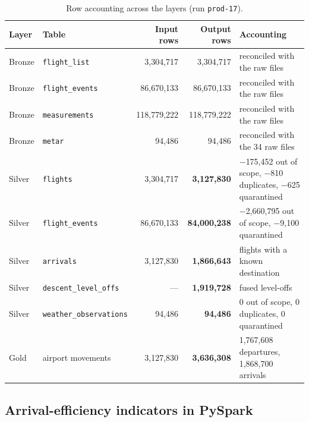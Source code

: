 \documentclass[11pt,a4paper]{article}
\begin{document}
\begin{table}[htbp]
\centering
\small
\caption{Row accounting across the layers (run \texttt{prod-17}).}
\footnotesize
\label{tab:accounting}
\begin{tabular}{llrrp{5.6cm}}
\toprule
\textbf{Layer} & \textbf{Table} & \textbf{Input rows} & \textbf{Output rows} & \textbf{Accounting} \\
\midrule
Bronze & \texttt{flight\_list} & 3,304,717 & 3,304,717 & reconciled with the raw files \\
Bronze & \texttt{flight\_events} & 86,670,133 & 86,670,133 & reconciled with the raw files \\
Bronze & \texttt{measurements} & 118,779,222 & 118,779,222 & reconciled with the raw files \\
Bronze & \texttt{metar} & 94,486 & 94,486 & reconciled with the 34 raw files \\
\midrule
Silver & \texttt{flights} & 3,304,717 & \textbf{3,127,830} & $-$175,452 out of scope, $-$810 duplicates, $-$625 quarantined \\
Silver & \texttt{flight\_events} & 86,670,133 & \textbf{84,000,238} & $-$2,660,795 out of scope, $-$9,100 quarantined \\
Silver & \texttt{arrivals} & 3,127,830 & \textbf{1,866,643} & flights with a known destination \\
Silver & \texttt{descent\_level\_offs} & --- & \textbf{1,919,728} & fused level-offs \\
Silver & \texttt{weather\_observations} & 94,486 & \textbf{94,486} & 0 out of scope, 0 duplicates, 0 quarantined \\
\midrule
Gold & airport movements & 3,127,830 & \textbf{3,636,308} & 1,767,608 departures, 1,868,700 arrivals \\
\bottomrule
\end{tabular}
\end{table}

\subsection{Arrival-efficiency indicators in PySpark}
\end{document}
